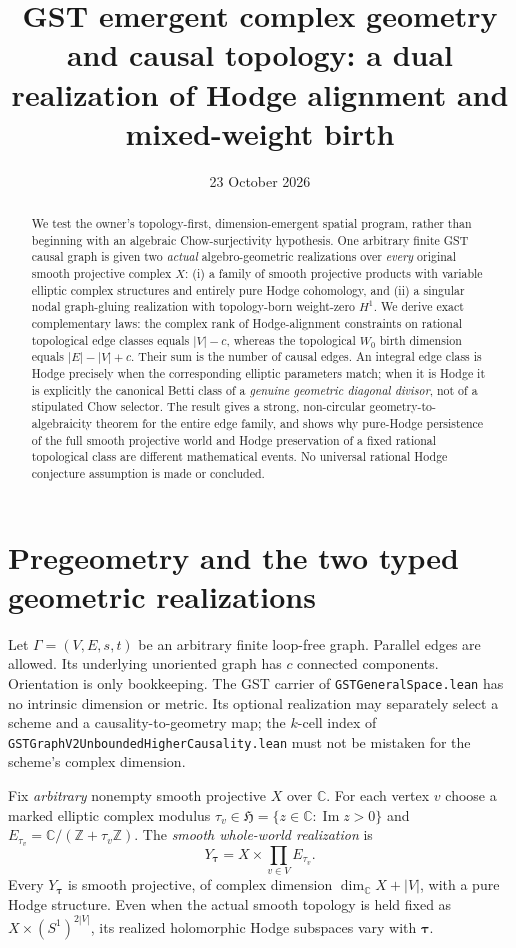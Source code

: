 \documentclass[11pt]{article}
\title{GST emergent complex geometry and causal topology: a dual realization of Hodge alignment and mixed-weight birth}
\date{23 October 2026}
\begin{document}
\maketitle
\begin{abstract}
We test the owner's topology-first, dimension-emergent spatial program,
rather than beginning with an algebraic Chow-surjectivity hypothesis.
One arbitrary finite GST causal graph is given two \emph{actual}
algebro-geometric realizations over \emph{every} original smooth projective
complex $X$: (i) a family of smooth projective products with variable
elliptic complex structures and entirely pure Hodge cohomology, and
(ii) a singular nodal graph-gluing realization with topology-born
weight-zero $H^1$. We derive exact complementary laws: the complex
rank of Hodge-alignment constraints on rational topological edge
classes equals $|V|-c$, whereas the topological $W_0$ birth
dimension equals $|E|-|V|+c$. Their sum is the number of causal edges.
An integral edge class is Hodge precisely when the corresponding
elliptic parameters match; when it is Hodge it is explicitly the
canonical Betti class of a \emph{genuine geometric diagonal divisor},
not of a stipulated Chow selector. The result gives a strong,
non-circular geometry-to-algebraicity theorem for the entire
edge family, and shows why pure-Hodge persistence of the full
smooth projective world and Hodge preservation of a fixed rational
topological class are different mathematical events. No universal
rational Hodge conjecture assumption is made or concluded.
\end{abstract}

\section{Pregeometry and the two typed geometric realizations}
Let $\Gamma=(V,E,s,t)$ be an arbitrary finite loop-free graph.
Parallel edges are allowed. Its underlying unoriented graph
has $c$ connected components. Orientation is only bookkeeping.
The GST carrier of \texttt{GSTGeneralSpace.lean} has no intrinsic
dimension or metric. Its optional realization may separately
select a scheme and a causality-to-geometry map; the
$k$-cell index of \texttt{GSTGraphV2UnboundedHigherCausality.lean}
must not be mistaken for the scheme's complex dimension.

Fix \emph{arbitrary} nonempty smooth projective $X$ over $\mathbb C$.
For each vertex $v$ choose a marked elliptic complex modulus
$\tau_v\in\mathfrak H=\{z\in\mathbb C:\operatorname{Im}z>0\}$ and
$E_{\tau_v}=\mathbb C/(\mathbb Z+\tau_v\mathbb Z)$.
The \emph{smooth whole-world realization} is
\[
 Y_{\boldsymbol\tau}=X\times\prod_{v\in V}E_{\tau_v}.
 \tag{1}
\]
Every $Y_{\boldsymbol\tau}$ is smooth projective, of complex
dimension $\dim_{\mathbb C}X+|V|$, with a pure Hodge structure.
Even when the actual smooth topology is held fixed as
$X\times(S^1)^{2|V|}$, its realized holomorphic Hodge subspaces
vary with $\boldsymbol\tau$.
\end{document}
